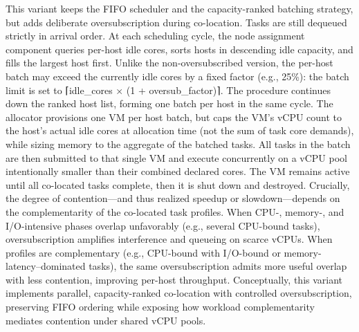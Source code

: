 This variant keeps the FIFO scheduler and the capacity-ranked batching strategy, but adds deliberate oversubscription during co-location. Tasks are still dequeued strictly in arrival order. At each scheduling cycle, the node assignment component queries per-host idle cores, sorts hosts in descending idle capacity, and fills the largest host first. Unlike the non-oversubscribed version, the per-host batch may exceed the currently idle cores by a fixed factor (e.g., 25\%): the batch limit is set to ⌈idle_cores × (1 + oversub_factor)⌉. The procedure continues down the ranked host list, forming one batch per host in the same cycle.
The allocator provisions one VM per host batch, but caps the VM’s vCPU count to the host’s actual idle cores at allocation time (not the sum of task core demands), while sizing memory to the aggregate of the batched tasks. All tasks in the batch are then submitted to that single VM and execute concurrently on a vCPU pool intentionally smaller than their combined declared cores. The VM remains active until all co-located tasks complete, then it is shut down and destroyed.
Crucially, the degree of contention—and thus realized speedup or slowdown—depends on the complementarity of the co-located task profiles. When CPU-, memory-, and I/O-intensive phases overlap unfavorably (e.g., several CPU-bound tasks), oversubscription amplifies interference and queueing on scarce vCPUs. When profiles are complementary (e.g., CPU-bound with I/O-bound or memory-latency–dominated tasks), the same oversubscription admits more useful overlap with less contention, improving per-host throughput. Conceptually, this variant implements parallel, capacity-ranked co-location with controlled oversubscription, preserving FIFO ordering while exposing how workload complementarity mediates contention under shared vCPU pools.


